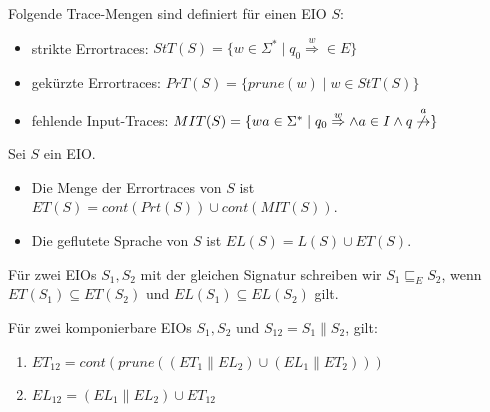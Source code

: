 \begin{Def}[Errortraces]
  Folgende Trace-Mengen sind definiert für einen EIO $S$:
  \begin{itemize}
    \item strikte Errortraces: $StT(S)=\{w\in\Sigma
      ^*\mid q_0\overset{w}{\Rightarrow}\in E\}$
    \item gekürzte Errortraces: $PrT(S)=\{prune(w)\mid w\in StT(S)\}$
    \item fehlende Input-Traces: $MIT(S)=\{wa\in\Sigma ^*\mid 
      q_0\overset{w}{\Rightarrow}\wedge a\in I\wedge
    q\overset{a}{\not{\hspace{-0.1cm}\rightarrow}}\}$
  \end{itemize}
\end{Def}

\begin{Def}
  \label{DefETEL}
  Sei $S$ ein EIO.
  \begin{itemize}
    \item Die Menge der Errortraces von $S$ ist $ET(S)=cont(Prt(S))\cup
      cont(MIT(S))$.
    \item Die geflutete Sprache von $S$ ist $EL(S)=L(S)\cup ET(S)$.
  \end{itemize}
  Für zwei EIOs $S_1, S_2$ mit der gleichen Signatur schreiben wir
  $S_1\sqsubseteq _E S_2$, wenn $ET(S_1)\subseteq ET(S_2)$ und
  $EL(S_1)\subseteq EL(S_2)$ gilt.
\end{Def}

\begin{satz}
  \label{satzErrorSemanik}
  Für zwei komponierbare EIOs $S_1, S_2$ und $S_{12}=S_1\|S_2$, gilt:
  \begin{enumerate}
    \item $ET_{12}=cont(prune((ET_1\|EL_2)\cup(EL_1\|ET_2)))$
    \item $EL_{12}=(EL_1\|EL_2)\cup ET_{12}$
  \end{enumerate}
\end{satz}

